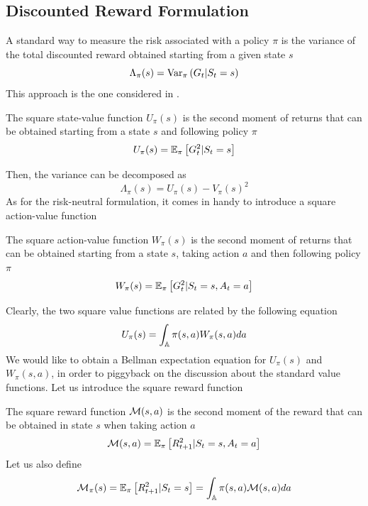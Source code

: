 \subsection{Discounted Reward Formulation}
A standard way to measure the risk associated with a policy $\pi$ is the variance of the total discounted reward obtained starting from a given state $s$
\begin{equation}
	\Lambda_\pi(s) = \Var[\pi]{G_t | S_t = s}
\end{equation}
This approach is the one considered in \cite{sobel1982variance}.
\begin{definition}
	The square state-value function $U_\pi(s)$ is the second moment of returns that can be obtained starting from a state $s$ and following policy $\pi$
	\begin{equation}
		U_\pi(s) = \E[\pi]{G_t^2 | S_t = s}
	\end{equation}
\end{definition}
Then, the variance can be decomposed as 
\begin{equation}
	\Lambda_\pi(s) = U_\pi(s) - V_\pi(s)^2
\end{equation}
As for the risk-neutral formulation, it comes in handy to introduce a square action-value function
\begin{definition}
	The square action-value function $W_\pi(s)$ is the second moment of returns that can be obtained starting from a state $s$, taking action $a$ and then following policy $\pi$
	\begin{equation}
		W_\pi(s) = \E[\pi]{G_t^2 | S_t = s, A_t = a}
	\end{equation}
\end{definition}
Clearly, the two square value functions are related by the following equation
\begin{equation}
	U_\pi(s) = \int_{\A} \pi(s,a) W_\pi(s,a) da
\end{equation}
We would like to obtain a Bellman expectation equation for $U_\pi(s)$ and $W_\pi(s,a)$, in order to piggyback on the discussion about the standard value functions. Let us introduce the square reward function 
\begin{definition}
	The square reward function $\calM(s,a)$ is the second moment of the reward that can be obtained in state $s$ when taking action $a$
	\begin{equation}
		\calM(s,a) = \E[\pi]{R_{t+1}^2 | S_t = s, A_t = a}
	\end{equation}
	Let us also define 
	\begin{equation}
		\calM_\pi(s) = \E[\pi]{R_{t+1}^2|S_t = s} = \int_\A \pi(s,a) \calM(s,a) da
	\end{equation}
\end{definition}
